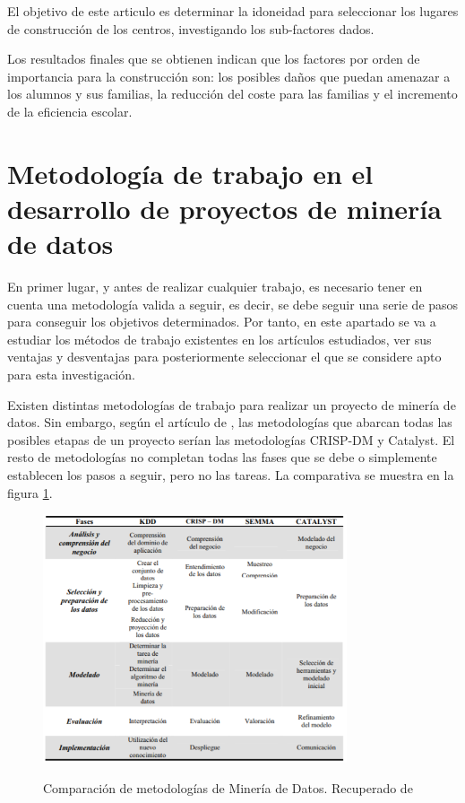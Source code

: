 El objetivo de este articulo es determinar la idoneidad para seleccionar los lugares de construcción de los centros, investigando los sub-factores dados.

Los resultados finales que se obtienen indican que los factores por orden de importancia para la construcción son: los posibles daños que puedan amenazar a los alumnos y sus familias, la reducción del coste para las familias y el incremento de la eficiencia escolar.

\section{Metodología de trabajo en el desarrollo de proyectos de minería de datos}
En primer lugar, y antes de realizar cualquier trabajo, es necesario tener en cuenta una metodología valida a seguir, es decir, se debe seguir una serie de pasos para conseguir los objetivos determinados. Por tanto, en este apartado se va a estudiar los métodos de trabajo existentes en los artículos estudiados, ver sus ventajas y desventajas para posteriormente seleccionar el que se considere apto para esta investigación.

Existen distintas metodologías de trabajo para realizar un proyecto de minería de datos. Sin embargo, según el artículo de , las metodologías que abarcan todas las posibles etapas de un proyecto serían las metodologías CRISP-DM y Catalyst. El resto de metodologías no completan todas las fases que se debe o simplemente establecen los pasos a seguir, pero no las tareas. La comparativa se muestra en la figura \ref{fig:compMod}.

\begin{figure}[htb]
	\centering
	\caption{
		Comparación de metodologías de Minería de Datos. Recuperado de \protect{}
	}
	\includegraphics[width=0.8\textwidth]{recursos/ComparacionModelosDM}
	\label{fig:compMod}
\end{figure}
\FloatBarrier


